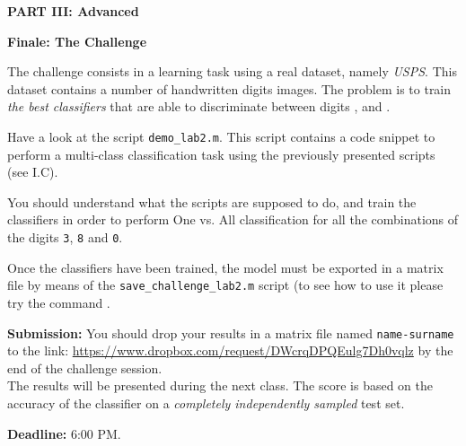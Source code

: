 \documentclass[DIN, pagenumber=false, fontsize=11pt, parskip=half]{scrartcl}
\newcommand{\mysection}[1]{\noindent\large\textbf{#1}}
\begin{document}
 
 


\begin{center}
\large\textbf{PART III: Advanced}
\end{center}

\mysection{Finale: The Challenge}

The challenge consists in a learning task using a real dataset, namely \emph{USPS}. This dataset contains a number of handwritten digits images. The problem is to train \emph{the best classifiers} that are able to discriminate between digits ,  and .

Have a look at the script \texttt{demo\_lab2.m}. This script contains a code snippet to perform a multi-class classification task using the previously presented scripts (see I.C).

You should understand what the scripts are supposed to do, and train the classifiers in order to perform One vs. All classification for all the combinations of the digits \texttt{3}, \texttt{8} and \texttt{0}.

Once the classifiers have been trained, the model must be exported in a matrix file by means of the \texttt{save\_challenge\_lab2.m} script (to see how to use it please try the command .

\begin{framed}
\textbf{Submission:}
You should drop your results in a matrix file named \texttt{name-surname} to the link: \url{https://www.dropbox.com/request/DWcrqDPQEulg7Dh0vqlz} by the end of the challenge session.\\
The results will be presented during the next class. The score is based on the accuracy of the classifier on a \textit{completely independently sampled} test set.

\textbf{Deadline:} 6:00 PM.
\end{framed}
\end{document}
